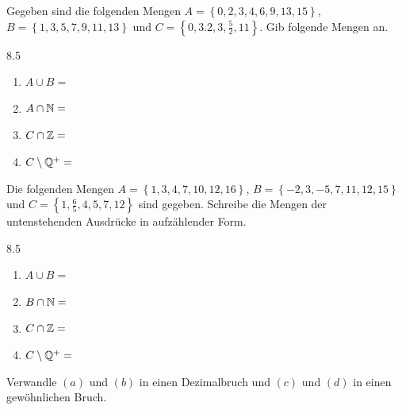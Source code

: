 \documentclass[11pt]{exam}
\begin{document}
\begin{questions}
\question[4]
Gegeben sind die folgenden Mengen $A=\left\{0,2,3,4,6,9,13,15\right\}$, $B=\left\{1,3,5,7,9,11,13\right\}$ und $C=\left\{0,3.2,3,\frac{5}{2},11\right\}$. Gib folgende Mengen an.
\begin{gridspace}{8.5}
   	\begin{enumerate}[label=(\alph*)]
   		\item $A\cup B=$
   		\item $A\cap \mathbb{N}=$
   		\item $C\cap \mathbb{Z}=$
   		\item $C\setminus \mathbb{Q}^+=$
   	\end{enumerate}
\end{gridspace}


\question[4]
Die folgenden Mengen $A=\left\{1,3,4,7,10,12,16\right\}$, $B=\left\{-2,3,-5,7,11,12,15\right\}$ und ${C=\left\{1,\frac{6}{5},4,5,7,12\right\}}$ sind gegeben. Schreibe die Mengen der untenstehenden Ausdrücke in aufzählender Form.
\begin{gridspace}{8.5}
	\begin{enumerate}[label=(\alph*)]
		\item $A\cup B=$
		\item $B\cap \mathbb{N}=$
		\item $C\cap \mathbb{Z}=$
		\item $C\setminus \mathbb{Q}^+=$
	\end{enumerate}
\end{gridspace}

\noaddpoints
\question[\totalpoints]
\addpoints
Verwandle $(a)$ und $(b)$ in einen Dezimalbruch und $(c)$ und $(d)$ in einen gewöhnlichen Bruch.



\end{questions}
\end{document}
